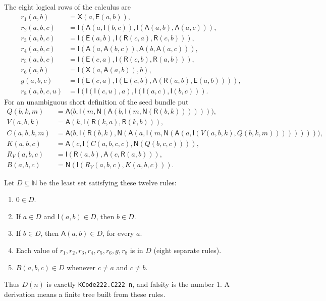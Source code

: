 \documentclass[11pt]{article}
\newcommand{\N}{\mathbb N}
\newcommand{\Imp}{\mathsf I}
\newcommand{\Rel}{\mathsf R}
\newcommand{\All}{\mathsf A}
\newcommand{\Eq}{\mathsf E}
\newcommand{\Neg}{\mathsf N}
\newcommand{\Ex}{\mathsf X}
\begin{document}
The eight logical rows of the calculus are
\begin{align*}
 r_1(a,b)&=\Ex(a,\Eq(a,b)),\\
 r_2(a,b,c)&=\Imp(\All(a,\Imp(b,c)),
                         \Imp(\All(a,b),\All(a,c))),\\
 r_3(a,b,c)&=\Imp(\Eq(a,b),\Imp(\Rel(c,a),\Rel(c,b))),\\
 r_4(a,b,c)&=\Imp(\All(a,\All(b,c)),\All(b,\All(a,c))),\\
 r_5(a,b,c)&=\Imp(\Eq(c,a),\Imp(\Rel(c,b),\Rel(a,b))),\\
 r_6(a,b)&=\Imp(\Ex(a,\All(a,b)),b),\\
 g(a,b,c)&=\Imp(\Eq(c,a),
                 \Imp(\Eq(c,b),\All(\Rel(a,b),\Eq(a,b)))),\\
 r_8(a,b,c,u)&=\Imp(\Imp(\Imp(c,u),a),
                        \Imp(\Imp(a,c),\Imp(b,c))).
\end{align*}
For an unambiguous short definition of the seed bundle put
\begin{align*}
 Q(b,k,m)&=\All\bigl(b,\Imp(m,
       \Neg(\All(b,\Imp(m,\Neg(\Rel(b,k))))))\bigr),\\
 V(a,b,k)&=\All(k,\Imp(\Rel(k,a),\Rel(k,b))),\\
 C(a,b,k,m)&=\All\bigl(b,\Imp(\Rel(b,k),
    \Neg(\All(a,\Imp(m,
      \Neg(\All(a,\Imp(V(a,b,k),Q(b,k,m))))))))\bigr),\\
 K(a,b,c)&=\All(c,\Imp(C(a,b,c,c),\Neg(Q(b,c,c)))),\\
 R_V(a,b,c)&=\Imp(\Rel(a,b),\All(c,\Rel(a,b))),\\
 B(a,b,c)&=\Neg(\Imp(R_V(a,b,c),K(a,b,c))).
\end{align*}

Let \(D\subseteq\N\) be the least set satisfying these twelve rules:
\begin{enumerate}
\item \(0\in D\).
\item If \(a\in D\) and \(\Imp(a,b)\in D\), then \(b\in D\).
\item If \(b\in D\), then \(\All(a,b)\in D\), for every \(a\).
\item Each value of \(r_1,r_2,r_3,r_4,r_5,r_6,g,r_8\) is in \(D\)
      (eight separate rules).
\item \(B(a,b,c)\in D\) whenever \(c\ne a\) and \(c\ne b\).
\end{enumerate}
Thus \(D(n)\) is exactly \texttt{KCode222.C222 n}, and falsity is the
number \(1\). A derivation means a finite tree built from these rules.
\end{document}
